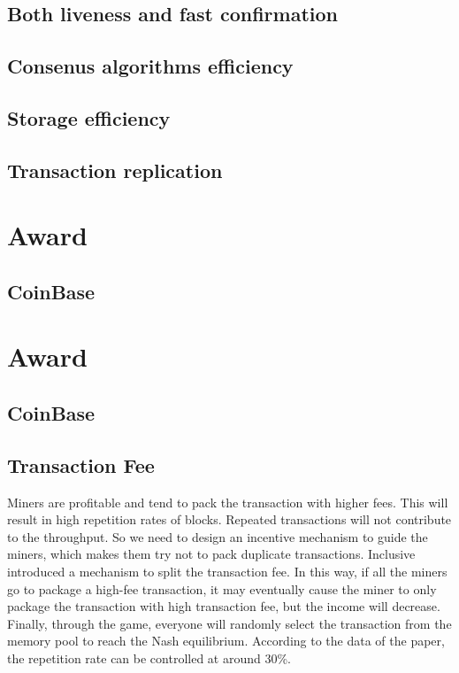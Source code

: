 \documentclass[a4paper,11pt]{article}
\begin{document}
\subsection{Both liveness and fast confirmation} 
\subsection{Consenus algorithms efficiency} 
\subsection{Storage efficiency} 
\subsection{Transaction replication} 

\section{Award}
\subsection{CoinBase}

\section{Award}
\subsection{CoinBase}
\subsection{Transaction Fee}

Miners are profitable and tend to pack the transaction with higher fees. This will result in high repetition rates of blocks. Repeated transactions will not contribute to the throughput. So we need to design an incentive mechanism to guide the miners, which makes them try not to pack duplicate transactions. Inclusive introduced a mechanism to split the transaction fee. In this way, if all the miners go to package a high-fee transaction, it may eventually cause the miner to only package the transaction with high transaction fee, but the income will decrease. Finally, through the game, everyone will randomly select the transaction from the memory pool to reach the Nash equilibrium. According to the data of the paper, the repetition rate can be controlled at around 30\%.
\end{document}
